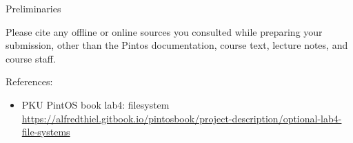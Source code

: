 \begin{titlepage}
\begin{aspect}{Preliminaries}
\begin{tcolorbox}
			Please cite any offline or online sources you consulted while
			preparing your submission, other than the Pintos documentation, course
			text, lecture notes, and course staff.
		\end{tcolorbox}
		References:
		\begin{itemize}
			\item PKU PintOS book lab4: filesystem\\
			      \url{https://alfredthiel.gitbook.io/pintosbook/project-description/optional-lab4-file-systems}
		\end{itemize}
	\end{aspect}

\end{titlepage}
